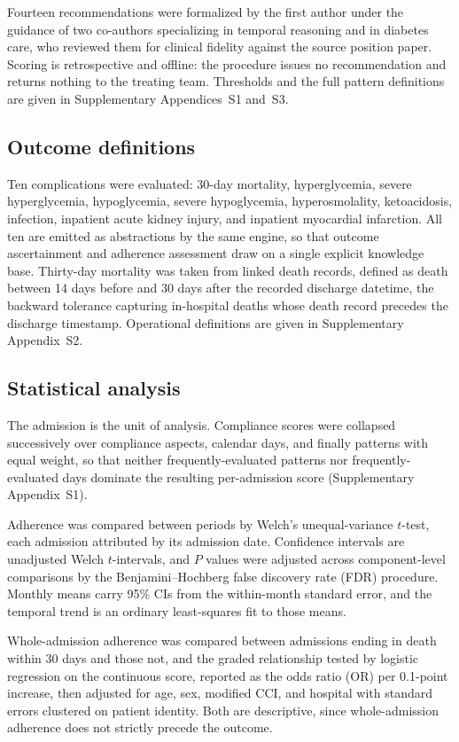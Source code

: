 Fourteen recommendations were formalized by the first author under the guidance
of two co-authors specializing in temporal reasoning and in diabetes care, who
reviewed them for clinical fidelity against the source position paper. Scoring
is retrospective and offline: the procedure issues no recommendation and
returns nothing to the treating team. Thresholds and the full pattern
definitions are given in Supplementary Appendices~S1 and~S3.

\subsection{Outcome definitions}

Ten complications were evaluated: 30-day mortality, hyperglycemia, severe
hyperglycemia, hypoglycemia, severe hypoglycemia, hyperosmolality,
ketoacidosis, infection, inpatient acute kidney injury, and inpatient
myocardial infarction. All ten are emitted as abstractions by the same engine,
so that outcome ascertainment and adherence assessment draw on a single
explicit knowledge base. Thirty-day mortality was taken from linked death
records, defined as death between 14 days before and 30 days after the recorded
discharge datetime, the backward tolerance capturing in-hospital deaths whose
death record precedes the discharge timestamp. Operational definitions are
given in Supplementary Appendix~S2.

\subsection{Statistical analysis}

The admission is the unit of analysis. Compliance scores were collapsed
successively over compliance aspects, calendar days, and finally patterns with
equal weight, so that neither frequently-evaluated patterns nor
frequently-evaluated days dominate the resulting per-admission score
(Supplementary Appendix~S1).

Adherence was compared between periods by Welch's unequal-variance $t$-test,
each admission attributed by its admission date. Confidence intervals are
unadjusted Welch $t$-intervals, and $P$ values were adjusted across
component-level comparisons by the Benjamini--Hochberg false discovery rate
(FDR) procedure.\citep{benjamini1995controlling} Monthly means carry 95\% CIs
from the within-month standard error, and the temporal trend is an ordinary
least-squares fit to those means.

Whole-admission adherence was compared between admissions ending in death
within 30 days and those not, and the graded relationship tested by logistic
regression on the continuous score, reported as the odds ratio (OR) per
0.1-point increase, then adjusted for age, sex, modified CCI, and hospital with
standard errors clustered on patient identity. Both are descriptive, since
whole-admission adherence does not strictly precede the outcome.

